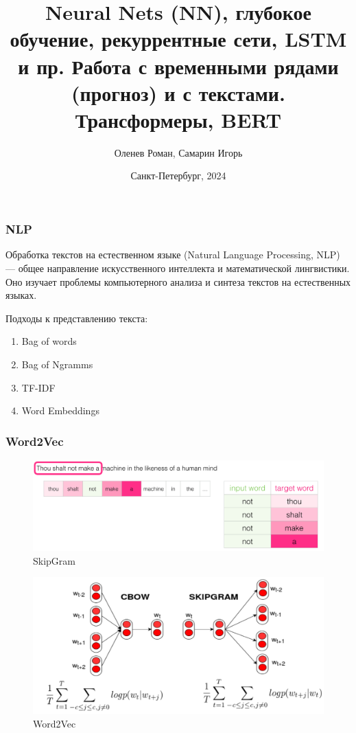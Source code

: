 \documentclass[notheorems, handout]{beamer}
\title[Neural Nets (NN), глубокое обучение, рекуррентные сети, LSTM и пр. Работа с временными рядами (прогноз) и с текстами. Трансформеры, BERT]{%
	    Neural Nets (NN), глубокое обучение, рекуррентные сети, LSTM и пр. Работа с временными рядами (прогноз) и с текстами. Трансформеры, BERT}
\author[Оленев Роман, Самарин Игорь]{Оленев Роман, Самарин Игорь}
\institute[Санкт-Петербургский Государственный Университет]{%
	    \small
	    Санкт-Петербургский государственный университет\\
	    Кафедра статистического моделирования\\
	    \vspace{1.25cm}
	}
\date[]{Санкт-Петербург, 2024}
\begin{document}
	
	\begin{frame}[plain]
		\titlepage
	\end{frame}
	
	
	\begin{frame}
	\frametitle{NLP}
		Обработка текстов на естественном языке (Natural Language Processing, NLP) --- общее направление искусственного интеллекта и математической лингвистики. Оно изучает проблемы компьютерного анализа и синтеза текстов на естественных языках.
		
		Подходы к представлению текста:
		\begin{enumerate}
			\item Bag of words
			\item Bag of Ngramms
			\item TF-IDF
			\item Word Embeddings
		\end{enumerate}
	\end{frame}
	
	\begin{frame}
	\frametitle{Word2Vec}
		\begin{figure}[H]
			\begin{center}
				\includegraphics[scale=0.15]{img/skip-gram.png}
				\caption{SkipGram}
			\end{center}
		\end{figure}
		
		\begin{figure}[H]
			\begin{center}
				\includegraphics[scale=0.35]{img/word2vec.png}
				\caption{Word2Vec}
			\end{center}
		\end{figure}
	\end{frame}
	
\end{document}
